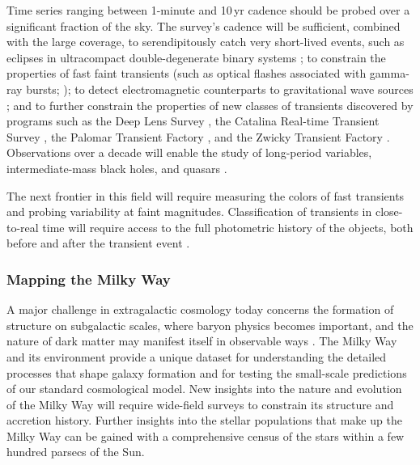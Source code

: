 Time series ranging between 1-minute and 10\,yr cadence should be
probed over a significant fraction of the sky. The survey's cadence
will be sufficient, combined with the large coverage, to
serendipitously catch very short-lived events, such as eclipses in
ultracompact double-degenerate binary systems \citep{2005AJ....130.2230A};
to constrain the properties of fast faint transients (such as optical
flashes associated with gamma-ray bursts; \citealt{2008AN....329..284B}); to
detect electromagnetic counterparts to gravitational wave sources
\citep{2013ApJ...767..124N,2018ApJ...852L...3S}; and to further constrain the
properties of new classes of transients discovered by programs such as
the Deep Lens Survey \citep{2004ApJ...611..418B}, the Catalina Real-time
Transient Survey \citep{2009ApJ...696..870D}, the Palomar Transient Factory
\citep{2009PASP..121.1395L}, and the Zwicky Transient Factory \citep{2014htu..conf...27B}. Observations
over a decade will enable the study of long-period variables, intermediate-mass
black holes, and quasars \citep{2007ApJ...659..997K,2010ApJ...721.1014M,2014MNRAS.439..703G,2016JCAP...11..042C}.


The next frontier
in this field will require measuring the colors of fast transients
and probing variability at faint magnitudes. Classification of transients in
close-to-real time will require access to the full photometric history
of the objects, both before and after the transient event
\citep[e.g.,][]{2011BASI...39..387M}.

\subsubsection{Mapping the Milky Way}

A major challenge in extragalactic cosmology today concerns the formation of structure on subgalactic scales, where
baryon physics becomes important, and the nature of dark matter may manifest itself in observable ways \citep[e.g.][]{2015PNAS..11212249W}.
The Milky Way and its environment provide a unique dataset for understanding the detailed processes that
shape galaxy formation and for testing the small-scale predictions of
our standard cosmological model. New insights into the nature and
evolution of the Milky Way will require wide-field surveys to constrain
its structure and accretion history.  Further insights into the stellar
populations that make up the Milky Way can be gained with a comprehensive census of the stars
within a few hundred parsecs of the Sun.

